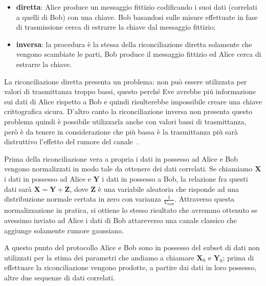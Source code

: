 \begin{itemize}
\item \textbf{diretta}: Alice produce un messaggio fittizio codificando i suoi dati (correlati a quelli di Bob) con una chiave. Bob basandosi sulle misure effettuate in fase di trasmissione cerca di estrarre la chiave dal messaggio fittizio;
\item \textbf{inversa}: la procedura \`e la stessa della riconciliazione diretta solamente che vengono scambiate le parti, Bob produce il messaggio fittizio ed Alice cerca di estrarre la chiave.
\end{itemize} 
 
La riconciliazione diretta presenta un problema: non pu\`o essere utilizzata per valori di trasmittanza troppo bassi, questo perch\'e Eve avrebbe pi\'u informazione sui dati di Alice rispetto a Bob e quindi risulterebbe impossibile creare una chiave crittografica sicura. D'altro canto la riconciliazione inversa non presenta questo problema quindi \`e possibile utilizzarla anche con valori bassi di trasmittanza, per\`o \`e da tenere in considerazione che pi\`u bassa \`e la trasmittanza pi\`u sar\`a distruttivo l'effetto del rumore del canale~\cite{https://doi.org/10.1002/qute.201800011}.

Prima della riconciliazione vera a propria i dati in possesso ad Alice e Bob vengono normalizzati in modo tale da ottenere dei dati correlati. Se chiamiamo $\textbf{X}$ i dati in possesso ad Alice e $\textbf{Y}$ i dati in possesso a Bob, la relazione fra questi dati sar\`a $\textbf{X} = \textbf{Y} + \textbf{Z}$, dove $\textbf{Z}$ \`e una variabile aleatoria che risponde ad una distribuzione normale certata in zero con varianza $\frac{1}{V_{mod}}$. Attraverso questa normalizzazione in pratica, si ottiene lo stesso risultato che avremmo ottenuto se avessimo inviato ad Alice i dati di Bob attareverso una canale classico che aggiunge solamente rumore gaussiano.

A questo punto del protocollo Alice e Bob sono in possesso del subset di dati non utilizzati per la stima dei parametri che andiamo a chiamare $\textbf{X}_0$ e $\textbf{Y}_0$; prima di effettuare la riconciliazione vengono prodotte, a partire dai dati in loro possesso, altre due sequenze di dati correlati. 

